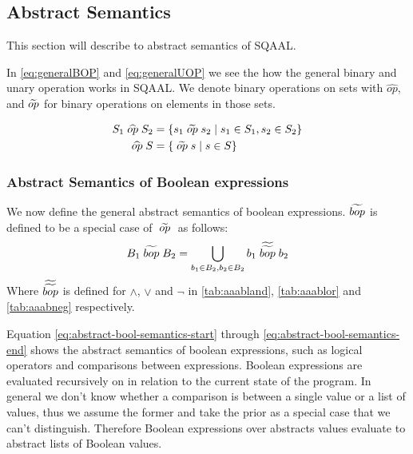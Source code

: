 \subsection{Abstract Semantics}\label{subsec:abstract-semantics}
This section will describe to abstract semantics of SQAAL.

In \autoref{eq:generalBOP} and \autoref{eq:generalUOP} we see the how the general binary and unary operation works in SQAAL.
We denote binary operations on sets with $\widehat{op}$, and $\widetilde{op}$ for binary operations on elements in those sets.

\begin{align}\label{eq:generalBOP}
    S_1 \aop S_2 &= \{ s_1 \aaop s_2 \mid s_1 \in S_1, s_2 \in S_2 \} \\ \label{eq:generalUOP}
    \aop S &= \{\aaop s \mid s \in S \}
\end{align}

\subsubsection{Abstract Semantics of Boolean expressions}
We now define the general abstract semantics of boolean expressions.
$\widetilde{bop}$ is defined to be a special case of $\;\widetilde{op}\;$ as follows:
\begin{align}
    B_1 \;\widetilde{bop}\; B_2 = \bigcup_{b_1 \in B_2, b_2 \in B_2} b_1 \;\widetilde{\widetilde{bop}}\; b_2
\end{align}
Where $\widetilde{\widetilde{bop}}$ is defined for $\land$, $\lor$ and $\neg$ in \autoref{tab:aaabland}, \autoref{tab:aaablor} and \autoref{tab:aaabneg} respectively.

Equation \ref{eq:abstract-bool-semantics-start} through \ref{eq:abstract-bool-semantics-end} shows the abstract semantics of boolean expressions, such as logical operators and comparisons between expressions.
Boolean expressions are evaluated recursively on in relation to the current state of the program.
In general we don't know whether a comparison is between a single value or a list of values, thus we assume the former and take the prior as a special case that we can't distinguish.
Therefore Boolean expressions over abstracts values evaluate to abstract lists of Boolean values.


